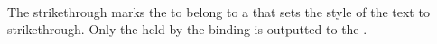  \\

The strikethrough  marks the  to belong to a  that sets the style of the text to strikethrough. Only the  held by the  binding is outputted to the . \\

\begin{examples}
  
\end{examples}

